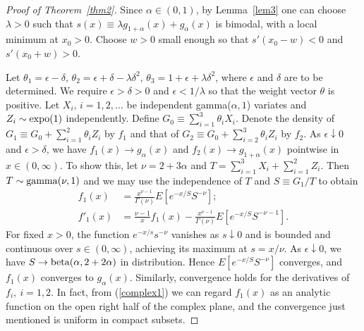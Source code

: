 \documentclass[11pt]{article}
\begin{document}
\begin{proof}[Proof of Theorem~\ref{thm2}]
Since $\alpha\in (0, 1)$, by Lemma~\ref{lem3} one can choose $\lambda>0$ such that $s(x)\equiv \lambda g_{1+\alpha}(x) +  g_{\alpha}(x)$ is bimodal, with a local minimum at $x_0>0$.  Choose $w>0$ small enough so that $s'(x_0 -w)<0$ and $s'(x_0+w)>0$. 

Let $\theta_1 = \epsilon-\delta,\, \theta_2 = \epsilon + \delta -\lambda\delta^2,\, \theta_3 = 1+\epsilon + \lambda\delta^2$, where $\epsilon$ and $\delta$ are to be determined.  We require $\epsilon>\delta>0$ and $\epsilon < 1/\lambda$ so that the weight vector $\theta$ is positive.  Let $X_i,\, i=1,2,\ldots$ be independent gamma($\alpha, 1$) variates and $Z_i\sim {\rm expo}(1)$ independently.  Define $G_0\equiv \sum_{i=1}^3 \theta_iX_i$.  Denote the density of $G_1\equiv G_0 + \sum_{i=1}^2\theta_iZ_i$ by $f_1$ and that of $G_2\equiv G_0+\sum_{i=2}^3 \theta_i Z_i$ by $f_2$.  As $\epsilon\downarrow 0$ and $\epsilon> \delta$, we have $f_1(x) \to g_{\alpha}(x)$ and $f_2(x)\to g_{1+\alpha}(x)$ pointwise in $x\in (0, \infty)$.  To show this, let $\nu= 2+3 \alpha$ and $T=\sum_{i=1}^3 X_i + \sum_{i=1}^2 Z_i$. Then $T\sim {\rm gamma}(\nu, 1)$ and we may use the independence of $T$ and $S\equiv G_1/T$ to obtain 
\begin{align}
\label{complex1}
f_1(x)  & = \frac{x^{\nu -1}}{\Gamma(\nu)} E \left[e^{-x/S} S^{-\nu}\right];\\
f'_1(x) & = \frac{\nu-1}{x} f_1(x) - \frac{x^{\nu -1}}{\Gamma(\nu)} E \left[e^{-x/S} S^{-\nu -1} \right].
\end{align}
For fixed $x>0$, the function $e^{-x/s} s^{-\nu}$ vanishes as $s\downarrow 0$ and is bounded and continuous over $s\in (0, \infty)$, achieving its maximum at $s = x/\nu$.  As $\epsilon\downarrow 0$, we have $S\to {\rm beta}(\alpha, 2 + 2\alpha)$ in distribution.  Hence $E \left[e^{-x/S} S^{-\nu}\right]$ converges, and $f_1(x) $ converges to $g_{\alpha} (x)$.  Similarly, convergence holds for the derivatives of $f_i,\ i=1,2$.  In fact, from (\ref{complex1}) we can regard $f_1(x)$ as an analytic function on the open right half of the complex plane, and the convergence just mentioned is uniform in compact subsets. 


\end{proof}
\end{document}
